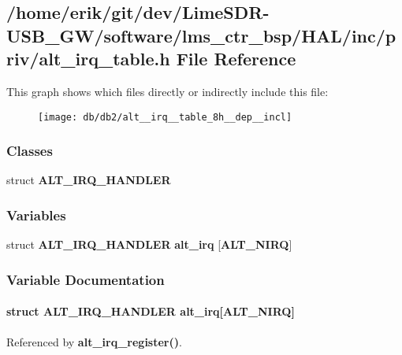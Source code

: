\subsection{/home/erik/git/dev/\+Lime\+S\+D\+R-\/\+U\+S\+B\+\_\+\+G\+W/software/lms\+\_\+ctr\+\_\+bsp/\+H\+A\+L/inc/priv/alt\+\_\+irq\+\_\+table.h File Reference}
\label{alt__irq__table_8h}
This graph shows which files directly or indirectly include this file\+:
\nopagebreak
\begin{figure}[H]
\begin{center}
\leavevmode
\texttt{[image: db/db2/alt\_\_irq\_\_table\_8h\_\_dep\_\_incl]}
\end{center}
\end{figure}
\subsubsection*{Classes}
\begin{DoxyCompactItemize}
\item 
struct {\bf A\+L\+T\+\_\+\+I\+R\+Q\+\_\+\+H\+A\+N\+D\+L\+ER}
\end{DoxyCompactItemize}
\subsubsection*{Variables}
\begin{DoxyCompactItemize}
\item 
struct {\bf A\+L\+T\+\_\+\+I\+R\+Q\+\_\+\+H\+A\+N\+D\+L\+ER} {\bf alt\+\_\+irq} [{\bf A\+L\+T\+\_\+\+N\+I\+RQ}]
\end{DoxyCompactItemize}


\subsubsection{Variable Documentation}
\paragraph[{alt\+\_\+irq}]{\setlength{\rightskip}{0pt plus 5cm}struct {\bf A\+L\+T\+\_\+\+I\+R\+Q\+\_\+\+H\+A\+N\+D\+L\+ER}  alt\+\_\+irq[{\bf A\+L\+T\+\_\+\+N\+I\+RQ}]}\label{alt__irq__table_8h_aa4777752cbe1ea5dd98ad562c328927f}


Referenced by {\bf alt\+\_\+irq\+\_\+register()}.

